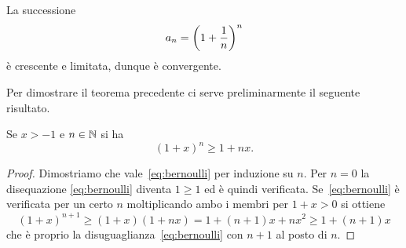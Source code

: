 \begin{theorem}
\mymark{**}%
\label{th:5767684}
La successione
\[
  a_n = {\left( 1+\frac 1 n \right)}^n
\]
è crescente e limitata, dunque è convergente.
\end{theorem}
%
Per dimostrare il teorema precedente ci serve 
preliminarmente il seguente risultato.
%
\begin{theorem}
  \label{th:disuguaglianza_bernoulli}%
  \mymark{**}%
  Se $x > -1$ e $n\in {\mathbb N}$ si ha
  \begin{equation}
  \label{eq:bernoulli}
  (1+x)^n \ge 1 + nx.
  \end{equation}
  \end{theorem}
  \begin{proof}
  \mymark{**}
  Dimostriamo che vale~\eqref{eq:bernoulli}
  per induzione su $n$.
  Per $n=0$ la disequazione \eqref{eq:bernoulli} diventa $1\ge 1$
  ed è quindi verificata.
  Se~\eqref{eq:bernoulli}
  è verificata per un certo $n$
  moltiplicando ambo i membri per $1+x > 0$ si ottiene
  \[
  (1+x)^{n+1} \ge (1+x) (1+nx) = 1 + (n+1)x + n x^2
  \ge 1 + (n+1)x
  \]
  che è proprio la disuguaglianza~\eqref{eq:bernoulli}
  con $n+1$ al posto di $n$.
  \end{proof}
%
